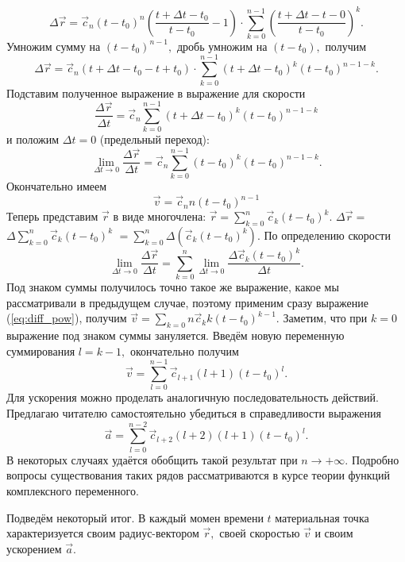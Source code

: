 $$\Delta \vec{r} = \vec{c}_n (t-t_0)^n\left(\frac{t+\Delta t-t_0}{t-t_0} - 1\right)\cdot 
				\sum\limits_{k=0}^{n-1}\left(\frac{t+\Delta t-t-0}{t-t_0}\right)^k.$$
Умножим сумму на $(t-t_0)^{n-1},$ дробь умножим на $(t-t_0),$ получим
$$\Delta \vec{r} = \vec{c}_n \left(t+\Delta t-t_0-t+t_0\right)\cdot 
				\sum\limits_{k=0}^{n-1}\left(t+\Delta t-t_0\right)^k\left(t-t_0\right)^{n-1-k}.$$
Подставим полученное выражение в выражение для скорости
$$\frac{\Delta \vec{r}}{\Delta t} = \vec{c}_n  
				\sum\limits_{k=0}^{n-1}\left(t+\Delta t-t_0\right)^k\left(t-t_0\right)^{n-1-k}$$
и положим $\Delta t = 0$ (предельный переход):
$$\lim\limits_{\Delta t \to 0}\frac{\Delta \vec{r}}{\Delta t} = \vec{c}_n  
				\sum\limits_{k=0}^{n-1}\left(t-t_0\right)^k\left(t-t_0\right)^{n-1-k}.$$
Окончательно имеем
\begin{equation}
\vec{v} = \vec{c}_n n(t-t_0)^{n-1}
\label{eq:diff_pow}
\end{equation}
Теперь представим $\vec{r}$ в виде многочлена: $\vec{r} = \sum\limits_{k=0}^{n}\vec{c}_k(t-t_0)^k.$
$\Delta \vec{r} =$ $
\Delta\sum\limits_{k=0}^{n}\vec{c}_k(t-t_0)^k$
$= \sum\limits_{k=0}^{n}\Delta\left(\vec{c}_k(t-t_0)^k\right).$
По определению скорости
$$\lim\limits_{\Delta t \to 0}\frac{\Delta \vec{r}}{\Delta t} 
= \sum\limits_{k=0}^{n}\lim\limits_{\Delta t \to 0}\frac{\Delta\vec{c}_k(t-t_0)^k}{\Delta t}.$$
Под знаком суммы получилось точно такое же выражение, какое мы рассматривали в предыдущем случае,
поэтому применим сразу выражение (\ref{eq:diff_pow}), получим
$\vec{v} = \sum\limits_{k=0}{n}\vec{c}_k k(t-t_0)^{k-1}.$
Заметим, что при $k=0$ выражение под
знаком суммы зануляется. Введём новую переменную суммирования $l=k-1,$ окончательно получим
\begin{equation}
\vec{v} = \sum\limits_{l=0}^{n-1}\vec{c}_{l+1}(l+1)(t-t_0)^{l}.
\label{eq:teilor_speed}
\end{equation}
Для ускорения можно проделать аналогичную последовательность действий. Предлагаю
читателю самостоятельно убедиться в справедливости выражения
\begin{equation}
\vec{a} = \sum\limits_{l=0}^{n-2}\vec{c}_{l+2}(l+2)(l+1)(t-t_0)^{l}.
\label{eq:teilor_accel}
\end{equation}
В некоторых случаях удаётся обобщить такой результат при $n \to +\infty.$ Подробно вопросы
существования таких рядов рассматриваются в курсе теории функций комплексного переменного.
\par
Подведём некоторый итог. В каждый момен времени $t$ материальная точка характеризуется
своим радиус-вектором $\vec{r},$ своей скоростью $\vec{v}$ и своим ускорением $\vec{a}.$
